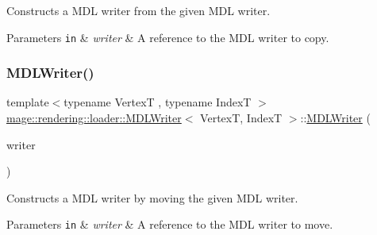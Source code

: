 Constructs a M\+DL writer from the given M\+DL writer.


\begin{DoxyParams}[1]{Parameters}
\mbox{\tt in}  & {\em writer} & A reference to the M\+DL writer to copy. \\
\hline
\end{DoxyParams}
\mbox{\label{classmage_1_1rendering_1_1loader_1_1_m_d_l_writer_a27f71b3a27f96e263948d19b8b570309}} 
\subsubsection{\texorpdfstring{M\+D\+L\+Writer()}{MDLWriter()}\hspace{0.1cm}{\footnotesize\ttfamily [3/3]}}
{\footnotesize\ttfamily template$<$typename VertexT , typename IndexT $>$ \\
\mbox{\hyperlink{classmage_1_1rendering_1_1loader_1_1_m_d_l_writer}{mage\+::rendering\+::loader\+::\+M\+D\+L\+Writer}}$<$ VertexT, IndexT $>$\+::\mbox{\hyperlink{classmage_1_1rendering_1_1loader_1_1_m_d_l_writer}{M\+D\+L\+Writer}} (\begin{DoxyParamCaption}\item[{\mbox{\hyperlink{classmage_1_1rendering_1_1loader_1_1_m_d_l_writer}{M\+D\+L\+Writer}}$<$ VertexT, IndexT $>$ \&\&}]{writer }\end{DoxyParamCaption})\hspace{0.3cm}{\ttfamily [noexcept]}}

Constructs a M\+DL writer by moving the given M\+DL writer.


\begin{DoxyParams}[1]{Parameters}
\mbox{\tt in}  & {\em writer} & A reference to the M\+DL writer to move. \\
\hline
\end{DoxyParams}
\mbox{\label{classmage_1_1rendering_1_1loader_1_1_m_d_l_writer_aaa0fb8c60dee5352ed467bfb3f283f43}} 
